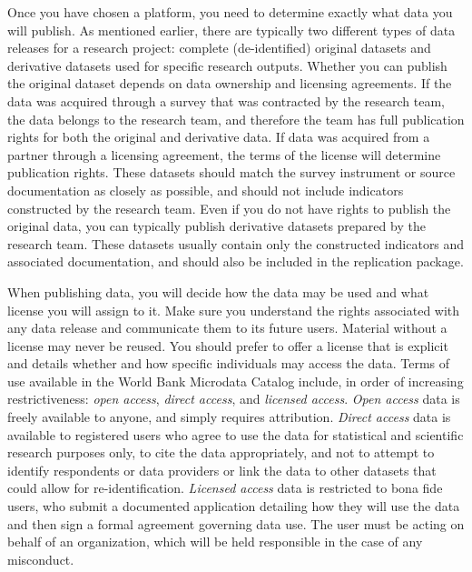 Once you have chosen a platform, you need to determine exactly what data you will publish.
As mentioned earlier, there are typically two different types of data releases for a research project:
complete (de-identified) original datasets and derivative datasets used for specific research outputs.
Whether you can publish the original dataset depends on data ownership and licensing agreements.
If the data was acquired through a survey that was contracted by the research team,
the data belongs to the research team,
and therefore the team has full publication rights for both the original and derivative data.
If data was acquired from a partner through a licensing agreement,
the terms of the license will determine publication rights.
These datasets should match the survey instrument or source documentation as closely as possible,
and should not include indicators constructed by the research team.
Even if you do not have rights to publish the original data,
you can typically publish derivative datasets prepared by the research team.
These datasets usually contain only the constructed indicators and associated documentation,
and should also be included in the replication package.

When publishing data,
you will decide how the data may be used and what license you will assign to it.
Make sure you understand the rights associated with any data release
and communicate them to its future users.
Material without a license may never be reused.
You should prefer to offer a license that is explicit
and details whether and how specific individuals may access the data.
Terms of use available in the World Bank Microdata Catalog include,
in order of increasing restrictiveness:
\textit{open access}, \textit{direct access}, and \textit{licensed access}.
\textit{Open access} data is freely available to anyone, and simply requires attribution.
\textit{Direct access} data is available to registered users who agree
to use the data for statistical and scientific research purposes only,
to cite the data appropriately,
and not to attempt to identify respondents or data providers
or link the data to other datasets that could allow for re-identification.
\textit{Licensed access} data is restricted to bona fide users,
who submit a documented application detailing
how they will use the data and then sign a formal agreement governing data use.
The user must be acting on behalf of an organization,
which will be held responsible in the case of any misconduct.

